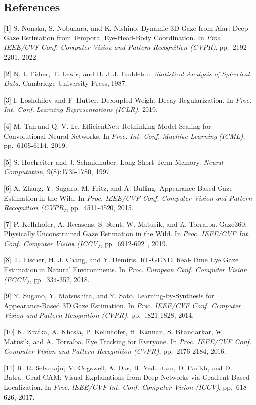 \documentclass[
]{article}
\begin{document}
\hypertarget{references}{%
\subsection{References}\label{references}}

{[}1{]} S. Nonaka, S. Nobuhara, and K. Nishino. Dynamic 3D Gaze from
Afar: Deep Gaze Estimation from Temporal Eye-Head-Body Coordination. In
\emph{Proc. IEEE/CVF Conf. Computer Vision and Pattern Recognition
(CVPR)}, pp.~2192-2201, 2022.

{[}2{]} N. I. Fisher, T. Lewis, and B. J. J. Embleton. \emph{Statistical
Analysis of Spherical Data}. Cambridge University Press, 1987.

{[}3{]} I. Loshchilov and F. Hutter. Decoupled Weight Decay
Regularization. In \emph{Proc. Int. Conf. Learning Representations
(ICLR)}, 2019.

{[}4{]} M. Tan and Q. V. Le. EfficientNet: Rethinking Model Scaling for
Convolutional Neural Networks. In \emph{Proc. Int. Conf. Machine
Learning (ICML)}, pp.~6105-6114, 2019.

{[}5{]} S. Hochreiter and J. Schmidhuber. Long Short-Term Memory.
\emph{Neural Computation}, 9(8):1735-1780, 1997.

{[}6{]} X. Zhang, Y. Sugano, M. Fritz, and A. Bulling. Appearance-Based
Gaze Estimation in the Wild. In \emph{Proc. IEEE/CVF Conf. Computer
Vision and Pattern Recognition (CVPR)}, pp.~4511-4520, 2015.

{[}7{]} P. Kellnhofer, A. Recasens, S. Stent, W. Matusik, and A.
Torralba. Gaze360: Physically Unconstrained Gaze Estimation in the Wild.
In \emph{Proc. IEEE/CVF Int. Conf. Computer Vision (ICCV)},
pp.~6912-6921, 2019.

{[}8{]} T. Fischer, H. J. Chang, and Y. Demiris. RT-GENE: Real-Time Eye
Gaze Estimation in Natural Environments. In \emph{Proc. European Conf.
Computer Vision (ECCV)}, pp.~334-352, 2018.

{[}9{]} Y. Sugano, Y. Matsushita, and Y. Sato. Learning-by-Synthesis for
Appearance-Based 3D Gaze Estimation. In \emph{Proc. IEEE/CVF Conf.
Computer Vision and Pattern Recognition (CVPR)}, pp.~1821-1828, 2014.

{[}10{]} K. Krafka, A. Khosla, P. Kellnhofer, H. Kannan, S. Bhandarkar,
W. Matusik, and A. Torralba. Eye Tracking for Everyone. In \emph{Proc.
IEEE/CVF Conf. Computer Vision and Pattern Recognition (CVPR)},
pp.~2176-2184, 2016.

{[}11{]} R. R. Selvaraju, M. Cogswell, A. Das, R. Vedantam, D. Parikh,
and D. Batra. Grad-CAM: Visual Explanations from Deep Networks via
Gradient-Based Localization. In \emph{Proc. IEEE/CVF Int. Conf. Computer
Vision (ICCV)}, pp.~618-626, 2017.
\end{document}
